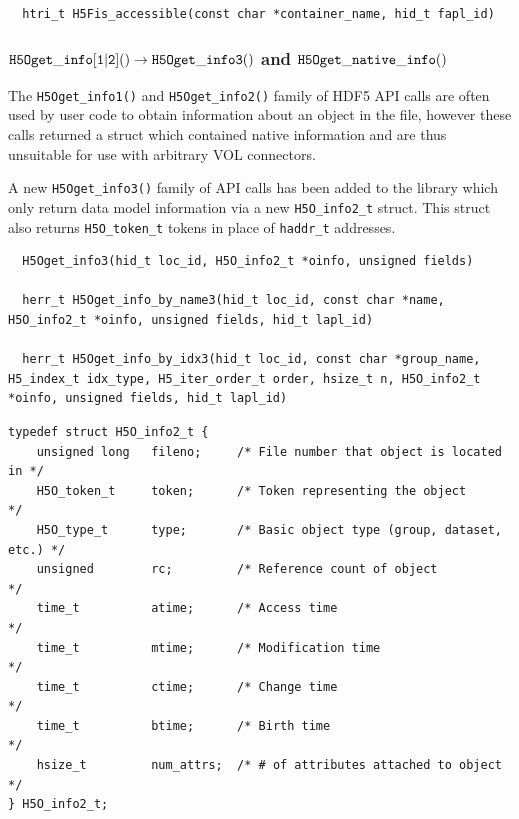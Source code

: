 \begin{lstlisting}
  htri_t H5Fis_accessible(const char *container_name, hid_t fapl_id)
\end{lstlisting}


\subsubsection{${\tt H5Oget\_info[1|2]()} \rightarrow {\tt H5Oget\_info3()}$ and ${\tt H5Oget\_native\_info()}$}

The {\tt H5Oget\_info1()} and {\tt H5Oget\_info2()} family of HDF5 API calls are often
used by user code to obtain information about an object in the file, however these
calls returned a struct which contained native information and are thus unsuitable
for use with arbitrary VOL connectors.

A new {\tt H5Oget\_info3()} family of API calls has been added to the library which only
return data model information via a new {\tt H5O\_info2\_t} struct. This
struct also returns {\tt H5O\_token\_t} tokens in place of {\tt haddr\_t}
addresses.

\begin{lstlisting}
  H5Oget_info3(hid_t loc_id, H5O_info2_t *oinfo, unsigned fields)

  herr_t H5Oget_info_by_name3(hid_t loc_id, const char *name, H5O_info2_t *oinfo, unsigned fields, hid_t lapl_id)

  herr_t H5Oget_info_by_idx3(hid_t loc_id, const char *group_name, H5_index_t idx_type, H5_iter_order_t order, hsize_t n, H5O_info2_t *oinfo, unsigned fields, hid_t lapl_id)
\end{lstlisting}

\begin{lstlisting}
typedef struct H5O_info2_t {
    unsigned long   fileno;     /* File number that object is located in */
    H5O_token_t     token;      /* Token representing the object        */
    H5O_type_t      type;       /* Basic object type (group, dataset, etc.) */
    unsigned        rc;         /* Reference count of object            */
    time_t          atime;      /* Access time                          */
    time_t          mtime;      /* Modification time                    */
    time_t          ctime;      /* Change time                          */
    time_t          btime;      /* Birth time                           */
    hsize_t         num_attrs;  /* # of attributes attached to object   */
} H5O_info2_t;
\end{lstlisting}

